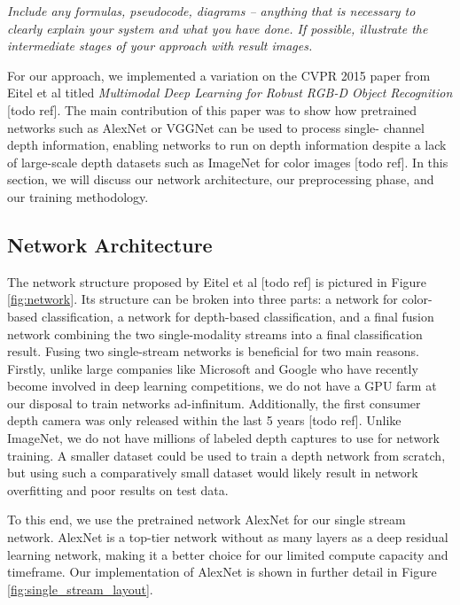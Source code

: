 
\textit{Include any formulas, pseudocode, diagrams -- anything that is
necessary to clearly explain your system and what you have done. If possible,
illustrate the intermediate stages of your approach with result images.}

For our approach, we implemented a variation on the CVPR 2015 paper from Eitel
et al titled \textit{Multimodal Deep Learning for Robust RGB-D Object
Recognition} [todo ref]. The main contribution of this paper was to show how
pretrained networks such as AlexNet or VGGNet can be used to process single-
channel depth information, enabling networks to run on depth information
despite a lack of large-scale depth datasets such as ImageNet for color images
[todo ref]. In this section, we will discuss our network architecture, our
preprocessing phase, and our training methodology.


\subsection{Network Architecture}

The network structure proposed by Eitel et al [todo ref] is pictured in Figure
\ref{fig:network}. Its structure can be broken into three parts: a network for
color-based classification, a network for depth-based classification, and a
final fusion network combining the two single-modality streams into a final
classification result. Fusing two single-stream networks is beneficial for two
main reasons. Firstly, unlike large companies like Microsoft and Google who
have recently become involved in deep learning competitions, we do not have a
GPU farm at our disposal to train networks ad-infinitum. Additionally, the
first consumer depth camera was only released within the last 5 years [todo
ref]. Unlike ImageNet, we do not have millions of labeled depth captures to
use for network training. A smaller dataset could be used to train a depth
network from scratch, but using such a comparatively small dataset would
likely result in network overfitting and poor results on test data.

To this end, we use the pretrained network AlexNet for our single stream
network. AlexNet is a top-tier network without as many layers as a deep
residual learning network, making it a better choice for our limited compute
capacity and timeframe. Our implementation of AlexNet is shown in further
detail in Figure \ref{fig:single_stream_layout}. 

